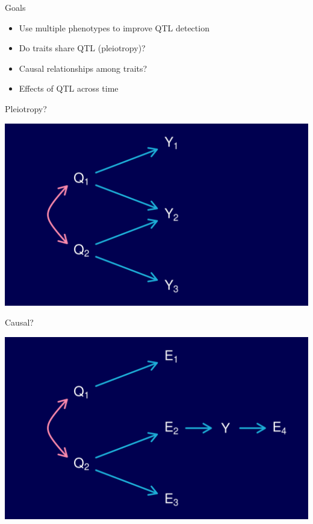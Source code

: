 \documentclass[12pt]{article}
\newcommand{\headsize}{\fontsize{35}{35} \selectfont}
\newcommand{\smallsize}{\fontsize{25}{30} \selectfont}
\begin{document}
\newpage

\headsize \color{myyellow}
\hfill \begin{minipage}{5.75in}
\centering
Goals
\end{minipage}

\vspace{30mm}

\color{mywhite} \smallsize

\hspace*{0.5in}
\begin{minipage}[t]{9.5in}
  \begin{itemize}
  \item Use multiple phenotypes to improve QTL detection
  \item Do traits share QTL (pleiotropy)?
  \item Causal relationships among traits?
  \item Effects of QTL across time
  \end{itemize}
\end{minipage}



\newpage

\headsize \color{myyellow}
\hfill \begin{minipage}{5.75in}
\centering
Pleiotropy?
\end{minipage}

\vspace{20mm}

\centerline{\includegraphics{Figs/pleiotropy_network.pdf}}


\newpage

\headsize \color{myyellow}
\hfill \begin{minipage}{5.75in}
\centering
Causal?
\end{minipage}

\vspace{22.3mm}

\centerline{\includegraphics{Figs/causal_network.pdf}}
\end{document}

